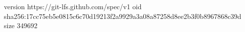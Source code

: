 version https://git-lfs.github.com/spec/v1
oid sha256:17cc75eb5e0815c6c70d19213f2a9929a3a08a87258d8ee2b3f0b8967868c39d
size 349692
